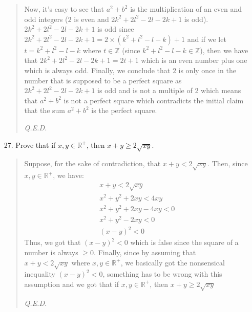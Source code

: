 \documentclass[12pt, a4paper]{article}                      %
\begin{document}
\begin{enumerate}
\begin{quote}
Now, it's easy to see that $a^2 + b^2$ is the multiplication of an even and odd
integers ($2$ is even and $2k^2 + 2l^2 - 2l - 2k + 1$ is odd). $2k^2 + 2l^2 - 2l - 2k + 1$ is
odd since $2k^2 + 2l^2 - 2l - 2k + 1 = 2 \times (k^2 + l^2 - l - k) + 1$ and if we let $t = k^2 + l^2 - l - k$
where $t \in \mathbb{Z}$ (since $k^2 + l^2 - l - k \in \mathbb{Z}$), then we have that $2k^2 + 2l^2 - 2l - 2k + 1 = 2t + 1$
which is an even number plus one which is always odd. Finally, we conclude that $2$ is only once in the number that is supposed to be a perfect square as
$2k^2 + 2l^2 - 2l - 2k + 1$ is odd and is not a multiple of 2 which means
that $a^2 + b^2$ is not a perfect square which contradicts the initial claim that the sum
$a^2 + b^2$ is the perfect square.
\begin{flushright}
\textit{Q.E.D.}
\end{flushright}
\end{quote}

\item[27.]
Prove that if $x,y \in \mathbb{R^+}$, then $x + y \geq 2\sqrt{xy}$.
\begin{quote}
Suppose, for the sake of contradiction, that $x + y < 2\sqrt{xy}$.
Then, since $x,y \in \mathbb{R^+}$, we have:
\begin{align}
x + y < 2\sqrt{xy}\\
x^2 + y^2 + 2xy < 4xy\\
x^2 + y^2 + 2xy -4xy < 0\\
x^2 + y^2 - 2xy < 0\\
(x - y)^2 < 0
\end{align}
Thus, we got that $(x-y)^2 < 0$ which is false since the square of a number
is always $\geq 0$. Finally, since by assuming that $x + y < 2 \sqrt{xy} \mbox{ where } x, y\in \mathbb{R^+}$, we basically
got the nonsensical inequality $(x-y)^2 < 0$, something has to be wrong with this assumption and we got that
if $x,y \in \mathbb{R^+}$, then $x + y \geq 2\sqrt{xy}$
\begin{flushright}
\textit{Q.E.D.}
\end{flushright}
\end{quote}


\end{enumerate}
\end{document}
